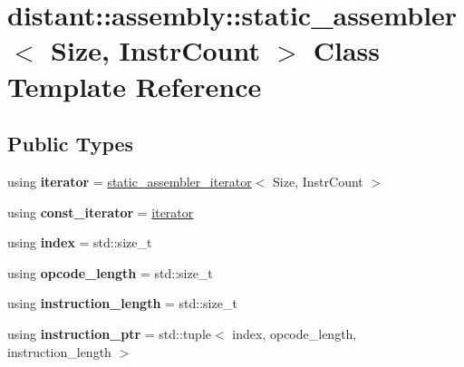 \hypertarget{classdistant_1_1assembly_1_1static__assembler}{}\section{distant\+:\+:assembly\+:\+:static\+\_\+assembler$<$ Size, Instr\+Count $>$ Class Template Reference}
\label{classdistant_1_1assembly_1_1static__assembler}
\subsection*{Public Types}
\begin{DoxyCompactItemize}
\item 
\mbox{\label{classdistant_1_1assembly_1_1static__assembler_a6844acc5b4275fdfa8e792ccc2c9d752}} 
using {\bfseries iterator} = \mbox{\hyperlink{classdistant_1_1assembly_1_1static__assembler__iterator}{static\+\_\+assembler\+\_\+iterator}}$<$ Size, Instr\+Count $>$
\item 
\mbox{\label{classdistant_1_1assembly_1_1static__assembler_aaa3429d102c44944957fbd42671409b7}} 
using {\bfseries const\+\_\+iterator} = \mbox{\hyperlink{classdistant_1_1assembly_1_1static__assembler__iterator}{iterator}}
\item 
\mbox{\label{classdistant_1_1assembly_1_1static__assembler_a777c4da52660a04ea2cc8bc498577933}} 
using {\bfseries index} = std\+::size\+\_\+t
\item 
\mbox{\label{classdistant_1_1assembly_1_1static__assembler_a14772cbaaa951decb64dcb6b98e33aeb}} 
using {\bfseries opcode\+\_\+length} = std\+::size\+\_\+t
\item 
\mbox{\label{classdistant_1_1assembly_1_1static__assembler_afd4e2df1cd2795194c011036327bf595}} 
using {\bfseries instruction\+\_\+length} = std\+::size\+\_\+t
\item 
\mbox{\label{classdistant_1_1assembly_1_1static__assembler_ab6e0b98d80d6094fce23502f2010ffba}} 
using {\bfseries instruction\+\_\+ptr} = std\+::tuple$<$ index, opcode\+\_\+length, instruction\+\_\+length $>$
\end{DoxyCompactItemize}
